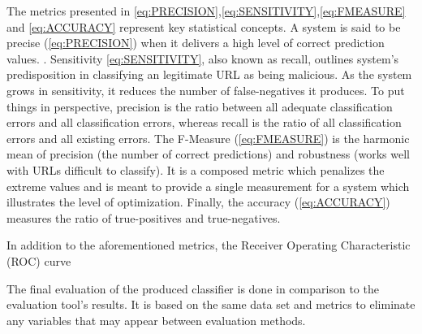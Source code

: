 The metrics presented in \ref{eq:PRECISION},\ref{eq:SENSITIVITY},\ref{eq:FMEASURE} and \ref{eq:ACCURACY} represent key statistical concepts. A system is said to be precise (\ref{eq:PRECISION}) when it delivers a high level of correct prediction values. . Sensitivity \ref{eq:SENSITIVITY}, also known as recall, outlines system's predisposition in classifying an legitimate URL as being malicious. As the system grows in sensitivity, it reduces the number of false-negatives it produces. To put things in perspective, precision is the ratio between all adequate classification errors and all classification errors, whereas recall is the ratio of all classification errors and all existing errors.
The F-Measure (\ref{eq:FMEASURE}) is the harmonic mean of precision (the number of correct predictions) and robustness (works well with URLs difficult to classify). It is a composed metric which penalizes the extreme values and is meant to provide a single measurement for a system which illustrates the level of optimization. Finally, the accuracy (\ref{eq:ACCURACY}) measures the ratio of true-positives and true-negatives.

In addition to the aforementioned metrics, the Receiver Operating Characteristic (ROC) curve

The final evaluation of the produced classifier is done in comparison to the evaluation tool's results. It is based on the same data set and metrics to eliminate any variables that may appear between evaluation methods.

\iffalse
	1st module Whitelist/Blacklist
	Hash urls and do lookups as cheap as possible
	2nd module Heuristics
	Compile a set of heuristics from the papers based on performance
	3rd module Visual similarity/Content evaluation
	Think about studying the visual similarity or some content evaluation if feasible
	4th module Machine learning
	use Cohen's kappa static to measure agreement between stacked machine learning algos
	URL classifier (supervised learning)
	Domain classifier (trained with https://github.com/elceef/dnstwist)
	DGA classifier (optional)

	Figures must be correctly numbered with captions and paragraph text should not be wrapped around figures - same rules apply to tables. An example of figures can be found below.
	\begin{figure}[t]
		\centering
		\texttt{[image: unilogo.jpg]}
		\caption{Bournemouth University}
		\label{fig:BULogo3}
	\end{figure}
	You should always start with an overview (Heading 2 style) to tell what this chapter is about and finkish with a summary (Heading 2 style) to tell what has been covered in this chapter.

	This chapter is about discussing your project planning and methodology. Note that your chosen methodology should be based on the constraints and complexity of your project instead of some common senses with no link to your own project.]
\fi
